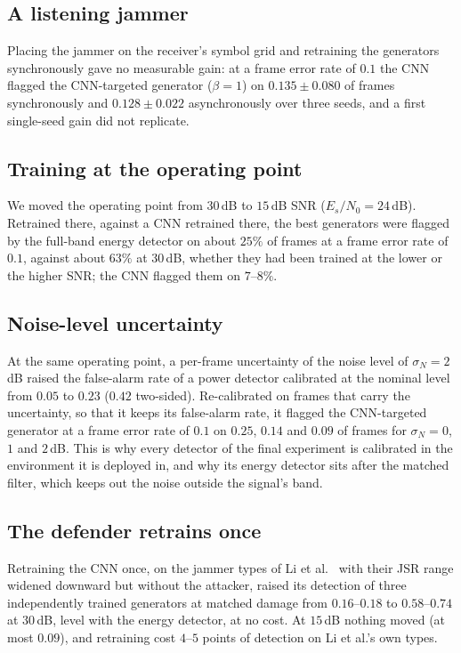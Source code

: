 \subsection{A listening jammer}
Placing the jammer on the receiver's symbol grid and retraining the generators synchronously gave no measurable gain: at a frame error rate of $0.1$ the CNN flagged the CNN-targeted generator ($\beta=1$) on $0.135\pm0.080$ of frames synchronously and $0.128\pm0.022$ asynchronously over three seeds, and a first single-seed gain did not replicate.

\subsection{Training at the operating point}
We moved the operating point from $30$\,dB to $15$\,dB SNR ($E_s/N_0=24$\,dB).
Retrained there, against a CNN retrained there, the best generators were flagged by the full-band energy detector on about $25\%$ of frames at a frame error rate of $0.1$, against about $63\%$ at $30$\,dB, whether they had been trained at the lower or the higher SNR; the CNN flagged them on $7$--$8\%$.

\subsection{Noise-level uncertainty}
At the same operating point, a per-frame uncertainty of the noise level of $\sigma_N=2$\,dB raised the false-alarm rate of a power detector calibrated at the nominal level from $0.05$ to $0.23$ ($0.42$ two-sided).
Re-calibrated on frames that carry the uncertainty, so that it keeps its false-alarm rate, it flagged the CNN-targeted generator at a frame error rate of $0.1$ on $0.25$, $0.14$ and $0.09$ of frames for $\sigma_N=0$, $1$ and $2$\,dB.
This is why every detector of the final experiment is calibrated in the environment it is deployed in, and why its energy detector sits after the matched filter, which keeps out the noise outside the signal's band.

\subsection{The defender retrains once}
Retraining the CNN once, on the jammer types of Li et al.~\cite{li2022jamming_ofdm} with their JSR range widened downward but without the attacker, raised its detection of three independently trained generators at matched damage from $0.16$--$0.18$ to $0.58$--$0.74$ at $30$\,dB, level with the energy detector, at no cost.
At $15$\,dB nothing moved (at most $0.09$), and retraining cost $4$--$5$ points of detection on Li et al.'s own types.


